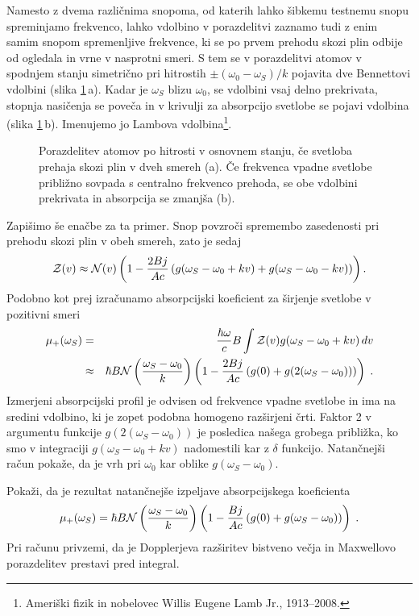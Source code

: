 Namesto z dvema različnima snopoma, od katerih lahko šibkemu testnemu snopu spreminjamo
frekvenco, lahko vdolbino v porazdelitvi zaznamo tudi z enim samim snopom
spremenljive frekvence, ki se po prvem prehodu skozi plin odbije od
ogledala in vrne v nasprotni smeri. S tem se v porazdelitvi atomov
v spodnjem stanju simetrično pri hitrostih $\pm(\omega_{0}-\omega_S)/k$
pojavita dve Bennettovi vdolbini (slika \ref{fig:Lamb}\,a).
Kadar je $\omega_S$ blizu $\omega_{0}$, se vdolbini vsaj delno prekrivata, 
stopnja nasičenja se poveča in v krivulji za absorpcijo svetlobe se pojavi 
vdolbina (slika \ref{fig:Lamb}\,b).
Imenujemo jo Lambova vdolbina\footnote{Ameriški fizik in nobelovec 
Willis Eugene Lamb Jr., 1913--2008.}. 
\begin{figure}[h]
\centering
\def\svgwidth{140truemm} 

\caption{Porazdelitev atomov po hitrosti v osnovnem stanju, če svetloba prehaja 
skozi plin v dveh smereh (a). Če frekvenca vpadne svetlobe približno sovpada s centralno 
frekvenco prehoda, se obe vdolbini prekrivata in absorpcija se zmanjša (b).}
\label{fig:Lamb}
\end{figure}

Zapišimo še enačbe za ta primer. Snop povzroči spremembo zasedenosti
pri prehodu skozi plin v obeh smereh, zato je sedaj 
\begin{equation}
{\cal Z}(v)\approx{\cal N}(v)\left(1-\frac{2Bj}{Ac}\left(g(\omega_S-\omega_{0}+kv)+
g(\omega_S-\omega_{0}-kv)\right)\right).
\label{4.92}
\end{equation}
Podobno kot prej izračunamo absorpcijski koeficient za širjenje svetlobe v
pozitivni smeri 
\begin{eqnarray}
\mu_{+}(\omega_S) & = & \frac{\hbar\omega}{c}B\int{\cal Z}(v)g(\omega_S-\omega_{0}+kv)\, dv\nonumber \\
 & \approx & \hbar B{\cal N}\left(\frac{\omega_S-\omega_0}{k}\right)\left(1-\frac{2Bj}
 {Ac}\left(g(0)+g(2(\omega_S-\omega_{0}))\right)\right)\;.
 \label{eq:lamb}
\end{eqnarray}
Izmerjeni absorpcijski profil je odvisen od frekvence vpadne svetlobe in ima na sredini vdolbino,
ki je zopet podobna homogeno razširjeni črti. Faktor 2 v argumentu
funkcije $g(2(\omega_S-\omega_{0}))$ je posledica našega grobega približka,
ko smo v integraciji $g(\omega_S-\omega_{0}+kv)$ nadomestili kar z
$\delta$ funkcijo. Natančnejši račun pokaže, da je vrh pri $\omega_{0}$
kar oblike $g(\omega_S-\omega_{0})$.

\begin{definition}
Pokaži, da je rezultat natančnejše izpeljave absorpcijskega koeficienta  
\begin{equation}
 \mu_{+}(\omega_S) = \hbar B{\cal N}\left(\frac{\omega_S-\omega_0}{k}\right)\left(1-\frac{Bj}
 {Ac}\left(g(0)+g(\omega_S-\omega_{0})\right)\right)\;.
\end{equation}
Pri računu privzemi, da je Dopplerjeva razširitev bistveno večja in Maxwellovo porazdelitev
prestavi pred integral. 
\end{definition}

